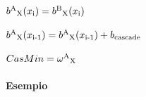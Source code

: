 \documentclass{report}
\newcommand{\myparagraph}[1]{\paragraph{#1}\mbox{} \mbox{}}
\begin{document}
\begin{center}
{\begin{minipage}{20em}
\begin{algorithmic}[1]
				\State $b\textsuperscript{A}\textsubscript{X}(x\textsubscript{i})=b\textsuperscript{B}\textsubscript{X}(x\textsubscript{i})$
	
			\EndIf
	
			\State $b\textsuperscript{A}\textsubscript{X}(x\textsubscript{i-1})=b\textsuperscript{A}\textsubscript{X}(x\textsubscript{i-1}) + b\textsubscript{cascade}$
	
		\EndFor
	
		\State $CasMin=\omega\textsuperscript{A}\textsubscript{X}$
	\end{algorithmic}
	\end{minipage}}
	\end{center}
	
	\hypertarget{header-n158}{%
		\myparagraph{Esempio}\label{header-n158}}
	
\end{document}
